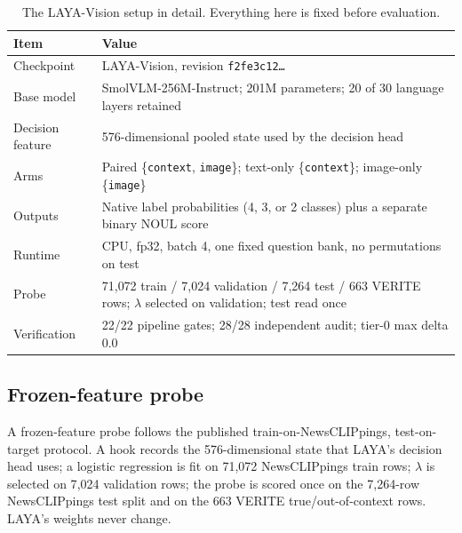 \documentclass[11pt]{article}
\begin{document}
\begin{table}[t]
\centering
\small
\caption{The LAYA-Vision setup in detail. Everything here is fixed before evaluation.}
\label{tab:laya}
\begin{tabularx}{\textwidth}{@{}l X@{}}
\toprule
\textbf{Item} & \textbf{Value} \\
\midrule
Checkpoint & LAYA-Vision, revision \texttt{f2fe3c12\ldots} \\
Base model & SmolVLM-256M-Instruct; 201M parameters; 20 of 30 language layers retained \\
Decision feature & 576-dimensional pooled state used by the decision head \\
Arms & Paired \{\texttt{context}, \texttt{image}\}; text-only \{\texttt{context}\}; image-only \{\texttt{image}\} \\
Outputs & Native label probabilities (4, 3, or 2 classes) plus a separate binary NOUL score \\
Runtime & CPU, fp32, batch 4, one fixed question bank, no permutations on test \\
Probe & 71{,}072 train / 7{,}024 validation / 7{,}264 test / 663 VERITE rows; $\lambda$ selected on validation; test read once \\
Verification & 22/22 pipeline gates; 28/28 independent audit; tier-0 max delta 0.0 \\
\bottomrule
\end{tabularx}
\end{table}

\subsection{Frozen-feature probe}
A frozen-feature probe follows the published train-on-NewsCLIPpings, test-on-target protocol. A hook records the 576-dimensional state that LAYA's decision head uses; a logistic regression is fit on 71{,}072 NewsCLIPpings train rows; $\lambda$ is selected on 7{,}024 validation rows; the probe is scored once on the 7{,}264-row NewsCLIPpings test split and on the 663 VERITE true/out-of-context rows. LAYA's weights never change.
\end{document}
